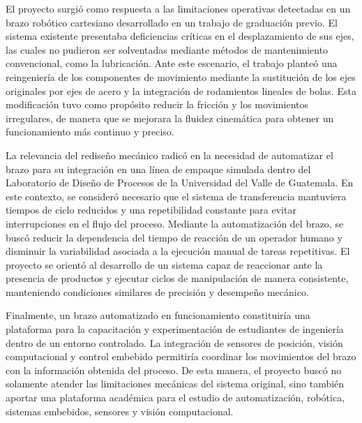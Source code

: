 El proyecto surgió como respuesta a las limitaciones operativas detectadas en un brazo robótico cartesiano desarrollado en un trabajo de graduación previo. El sistema existente presentaba deficiencias críticas en el desplazamiento de sus ejes, las cuales no pudieron ser solventadas mediante métodos de mantenimiento convencional, como la lubricación. Ante este escenario, el trabajo planteó una reingeniería de los componentes de movimiento mediante la sustitución de los ejes originales por ejes de acero y la integración de rodamientos lineales de bolas. Esta modificación tuvo como propósito reducir la fricción y los movimientos irregulares, de manera que se mejorara la fluidez cinemática para obtener un funcionamiento más continuo y preciso.

La relevancia del rediseño mecánico radicó en la necesidad de automatizar el brazo para su integración en una línea de empaque simulada dentro del Laboratorio de Diseño de Procesos de la Universidad del Valle de Guatemala. En este contexto, se consideró necesario que el sistema de transferencia mantuviera tiempos de ciclo reducidos y una repetibilidad constante para evitar interrupciones en el flujo del proceso. Mediante la automatización del brazo, se buscó reducir la dependencia del tiempo de reacción de un operador humano y disminuir la variabilidad asociada a la ejecución manual de tareas repetitivas. El proyecto se orientó al desarrollo de un sistema capaz de reaccionar ante la presencia de productos y ejecutar ciclos de manipulación de manera consistente, manteniendo condiciones similares de precisión y desempeño mecánico.

Finalmente, un brazo automatizado en funcionamiento constituiría una plataforma para la capacitación y experimentación de estudiantes de ingeniería dentro de un entorno controlado. La integración de sensores de posición, visión computacional y control embebido permitiría coordinar los movimientos del brazo con la información obtenida del proceso. De esta manera, el proyecto buscó no solamente atender las limitaciones mecánicas del sistema original, sino también aportar una plataforma académica para el estudio de automatización, robótica, sistemas embebidos, sensores y visión computacional.